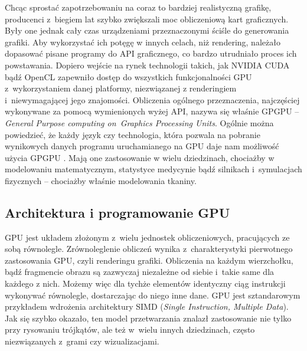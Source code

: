 		Chcąc sprostać zapotrzebowaniu na coraz to bardziej realistyczną grafikę, producenci z~biegiem lat szybko zwiększali moc obliczeniową kart graficznych. Były one jednak cały czas urządzeniami przeznaczonymi ściśle do generowania grafiki. Aby wykorzystać ich potęgę w innych celach, niż rendering, należało dopasować pisane programy do API graficznego, co bardzo utrudniało proces ich powstawania. Dopiero wejście na rynek technologii takich, jak NVIDIA CUDA bądź OpenCL zapewniło dostęp do wszystkich funkcjonalności GPU z~wykorzystaniem danej platformy, niezwiązanej z renderingiem i~niewymagającej jego znajomości. Obliczenia ogólnego przeznaczenia, najczęściej wykonywane za pomocą wymienionych wyżej API, nazywa się właśnie GPGPU -- \emph{General Purpose computing on~Graphics Processing Units}. Ogólnie można powiedzieć, że każdy język czy technologia, która pozwala na pobranie wynikowych danych programu uruchamianego na GPU daje nam możliwość użycia GPGPU \cite{gpu_wiki}. Mają one zastosowanie w wielu dziedzinach, chociażby w modelowaniu matematycznym, statystyce medycynie bądź silnikach i~symulacjach fizycznych -- chociażby właśnie modelowania tkaniny. 
	
		\subsection{Architektura i programowanie GPU}
		\label{t:teoria:gpu:architektura}
		
		
		GPU jest układem złożonym z~wielu jednostek obliczeniowych, pracujących ze sobą równolegle. Zrównoleglenie obliczeń wynika z~charakterystyki pierwotnego zastosowania GPU, czyli renderingu grafiki. Obliczenia na każdym wierzchołku, bądź fragmencie obrazu są zazwyczaj niezależne od siebie i~takie same dla każdego z nich. Możemy więc dla tychże elementów identyczny ciąg instrukcji wykonywać równolegle, dostarczając do niego inne dane. GPU jest sztandarowym przykładem wdrożenia architektury SIMD (\emph{Single Instruction, Multiple Data}). Jak się szybko okazało, ten model przetwarzania znalazł zastosowanie nie tylko przy rysowaniu trójkątów, ale też w~wielu innych dziedzinach, często niezwiązanych z~grami czy wizualizacjami.
		
